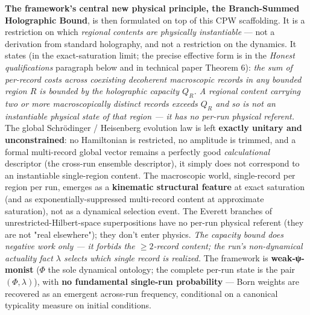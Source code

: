 \documentclass[11pt,a4paper]{article}
\begin{document}
\textbf{The framework's central new physical principle, the Branch-Summed Holographic Bound}, is then formulated on top of this CPW scaffolding. It is a restriction on which \emph{regional contents are physically instantiable} — not a derivation from standard holography, and not a restriction on the dynamics. It states (in the exact-saturation limit; the precise effective form is in the \emph{Honest qualifications} paragraph below and in technical paper Theorem 6): \emph{the sum of per-record costs across coexisting decoherent macroscopic records in any bounded region $R$ is bounded by the holographic capacity $Q_R$. A regional content carrying two or more macroscopically distinct records exceeds $Q_R$ and so is not an instantiable physical state of that region — it has no per-run physical referent.} The global Schrödinger / Heisenberg evolution law is left \textbf{exactly unitary and unconstrained}: no Hamiltonian is restricted, no amplitude is trimmed, and a formal multi-record global vector remains a perfectly good \emph{calculational} descriptor (the cross-run ensemble descriptor), it simply does not correspond to an instantiable single-region content. The macroscopic world, single-record per region per run, emerges as a \textbf{kinematic structural feature} at exact saturation (and as exponentially-suppressed multi-record content at approximate saturation), not as a dynamical selection event. The Everett branches of unrestricted-Hilbert-space superpositions have no per-run physical referent (they are not "real elsewhere"); they don't enter physics. \emph{The capacity bound does negative work only — it forbids the $\ge 2$-record content; the run's non-dynamical actuality fact $\lambda$ selects which single record is realized.} The framework is \textbf{weak-ψ-monist} ($\Phi$ the sole dynamical ontology; the complete per-run state is the pair $(\Phi,\lambda)$), with \textbf{no fundamental single-run probability} — Born weights are recovered as an emergent across-run frequency, conditional on a canonical typicality measure on initial conditions.
\end{document}

